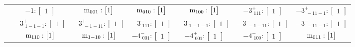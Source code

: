 \documentclass[fleqn,8pt,landscape]{jsarticle}
\begin{document}
\begin{longtable}{ccccccc}
& $ -1:\begin{bmatrix} 1 \end{bmatrix} $ & $ {\rm m}_{001}:\begin{bmatrix} 1 \end{bmatrix} $ & $ {\rm m}_{010}:\begin{bmatrix} 1 \end{bmatrix} $ & $ {\rm m}_{100}:\begin{bmatrix} 1 \end{bmatrix} $ & $ -3^{+}_{\,\,111}:\begin{bmatrix} 1 \end{bmatrix} $ & $ -3^{+}_{\,\,-11-1}:\begin{bmatrix} 1 \end{bmatrix} $ \\
& $ -3^{+}_{\,\,1-1-1}:\begin{bmatrix} 1 \end{bmatrix} $ & $ -3^{+}_{\,\,-1-11}:\begin{bmatrix} 1 \end{bmatrix} $ & $ -3^{-}_{\,\,111}:\begin{bmatrix} 1 \end{bmatrix} $ & $ -3^{-}_{\,\,1-1-1}:\begin{bmatrix} 1 \end{bmatrix} $ & $ -3^{-}_{\,\,-1-11}:\begin{bmatrix} 1 \end{bmatrix} $ & $ -3^{-}_{\,\,-11-1}:\begin{bmatrix} 1 \end{bmatrix} $ \\
& $ {\rm m}_{110}:\begin{bmatrix} 1 \end{bmatrix} $ & $ {\rm m}_{1-10}:\begin{bmatrix} 1 \end{bmatrix} $ & $ -4^{-}_{\,\,001}:\begin{bmatrix} 1 \end{bmatrix} $ & $ -4^{+}_{\,\,001}:\begin{bmatrix} 1 \end{bmatrix} $ & $ -4^{-}_{\,\,100}:\begin{bmatrix} 1 \end{bmatrix} $ & $ {\rm m}_{011}:\begin{bmatrix} 1 \end{bmatrix} $ \\

\end{longtable}
\end{document}
